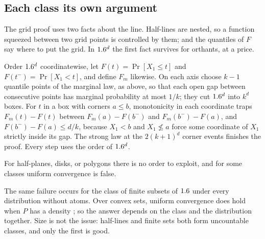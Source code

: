 \begin{refsection}
\subsection{Each class its own argument}\label{sec:vc:cases}

The grid proof uses two facts about the line. Half-lines are nested, so a function squeezed between two grid points is controlled by them; and the quantiles of $F$ say where to put the grid. In $1.6^d$ the first fact survives for orthants, at a price.

\begin{aside}
Order $1.6^d$ coordinatewise, let $F(t) = \Pr[X_1\le t]$ and $F(t^-) = \Pr[X_1<t]$, and define $F_m$ likewise. On each axis choose $k-1$ quantile points of the marginal law, as above, so that each open gap between consecutive points has marginal probability at most $1/k$; they cut $1.6^d$ into $k^d$ boxes. For $t$ in a box with corners $a\le b$, monotonicity in each coordinate traps $F_m(t)-F(t)$ between $F_m(a)-F(b^-)$ and $F_m(b^-)-F(a)$, and $F(b^-)-F(a)\le d/k$, because $X_1<b$ and $X_1\not\le a$ force some coordinate of $X_1$ strictly inside its gap. The strong law at the $2(k+1)^d$ corner events finishes the proof. Every step uses the order of $1.6^d$.
\end{aside}

For half-planes, disks, or polygons there is no order to exploit, and for some classes uniform convergence is false.


The same failure occurs for the class of finite subsets of $1.6$ under every distribution without atoms. Over convex sets, uniform convergence does hold when $P$ has a density \parencite{RangaRao1962}; so the answer depends on the class and the distribution together. Size is not the issue: half-lines and finite sets both form uncountable classes, and only the first is good.


\end{refsection}
